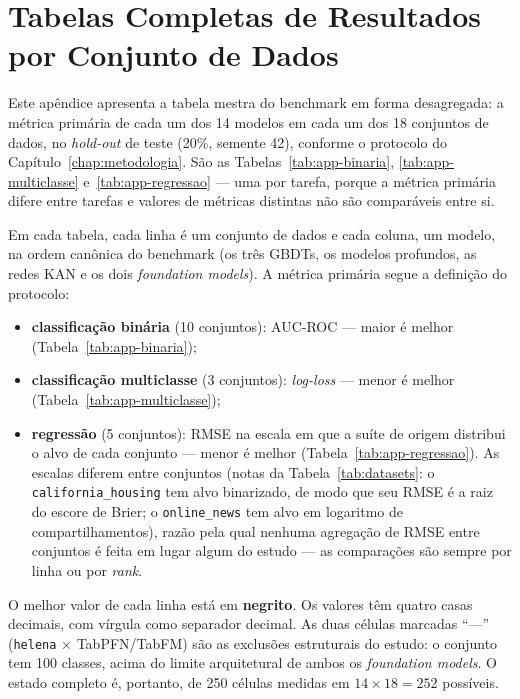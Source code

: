 \chapter[Tabelas Completas de Resultados por Conjunto de Dados]{Tabelas Completas de Resultados\texorpdfstring{\\}{ }por Conjunto de Dados}
\label{app:tabelas}

Este apêndice apresenta a tabela mestra do benchmark em forma
desagregada: a métrica primária de cada um dos 14 modelos em cada um
dos 18 conjuntos de dados, no \emph{hold-out} de teste (20\%, semente
42), conforme o protocolo do Capítulo~\ref{chap:metodologia}. São as
Tabelas~\ref{tab:app-binaria}, \ref{tab:app-multiclasse}
e~\ref{tab:app-regressao} --- uma por tarefa, porque a métrica
primária difere entre tarefas e valores de métricas distintas não são
comparáveis entre si.

Em cada tabela, cada linha é um conjunto de dados e cada coluna, um
modelo, na ordem canônica do benchmark (os três GBDTs,
os modelos profundos, as redes KAN e os dois \emph{foundation
models}). A métrica primária segue a definição do protocolo:
\begin{itemize}
  \item \textbf{classificação binária} (10 conjuntos): AUC-ROC ---
    maior é melhor (Tabela~\ref{tab:app-binaria});
  \item \textbf{classificação multiclasse} (3 conjuntos):
    \emph{log-loss} --- menor é melhor
    (Tabela~\ref{tab:app-multiclasse});
  \item \textbf{regressão} (5 conjuntos): RMSE na escala em que a
    suíte de origem distribui o alvo de cada conjunto --- menor é
    melhor (Tabela~\ref{tab:app-regressao}). As escalas diferem entre
    conjuntos (notas da Tabela~\ref{tab:datasets}: o
    \texttt{california\_\allowbreak housing} tem alvo binarizado, de modo que seu
    RMSE é a raiz do escore de Brier; o \texttt{online\_news} tem alvo
    em logaritmo de compartilhamentos), razão pela qual nenhuma
    agregação de RMSE entre conjuntos é feita em lugar algum do
    estudo --- as comparações são sempre por linha ou por \emph{rank}.
\end{itemize}
O melhor valor de cada linha está em \textbf{negrito}. Os valores têm
quatro casas decimais, com vírgula como separador decimal. As duas
células marcadas ``---'' (\texttt{helena} $\times$
TabPFN/TabFM) são as exclusões estruturais do estudo: o conjunto tem
100 classes, acima do limite arquitetural de ambos os
\emph{foundation models}. O estado completo é, portanto, de 250
células medidas em $14 \times 18 = 252$ possíveis.

